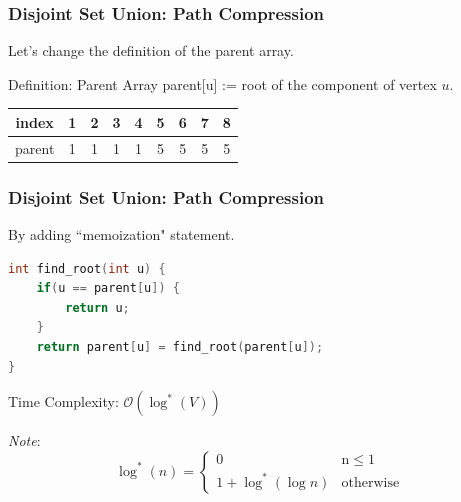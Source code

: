 \begin{frame}
\frametitle{Disjoint Set Union: Path Compression}
Let's change the definition of the parent array.
\begin{block}{Definition: Parent Array}
    parent[u] := root of the component of vertex $u$.
\end{block}

\begin{center}
\end{center}

\begin{center}
\begin{tabular}{|c||c|c|c|c|c|c|c|c|}
    \hline
    index & 1 & 2 & 3 & 4 & 5 & 6 & 7 & 8\\
    \hline
    \hline
    parent & 1 & 1 & 1 & 1 & 5 & 5 & 5 & 5\\
    \hline
\end{tabular}
\end{center}
\end{frame}

\begin{frame}[fragile]
\frametitle{Disjoint Set Union: Path Compression}
By adding ``memoization" statement.
\begin{lstlisting}[language=C++, basicstyle=\small]
int find_root(int u) {
    if(u == parent[u]) {
        return u;
    }
    return parent[u] = find_root(parent[u]);
}
\end{lstlisting}
Time Complexity: $\mathcal{O}(\log^*(V))$

\textit{Note}:
\[
    \log^{*}(n) = \begin{cases}
        0 & \mathrm{n} \le 1\\
        1+\log^{*}(\log{n}) & \mathrm{otherwise}
    \end{cases}
\]

\end{frame}

